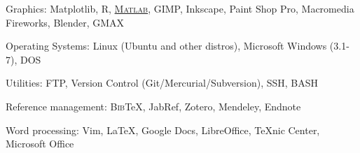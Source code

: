 \documentclass[10pt]{article}
\newcommand{\blankline}{\quad\pagebreak[2]}
\begin{document}
\blankline

Graphics: Matplotlib, R,
\href{http://www.mathworks.com/products/matlab/}{\textsc{Matlab}}, GIMP,
Inkscape, Paint Shop Pro, Macromedia Fireworks, Blender, GMAX

\blankline

Operating Systems: Linux (Ubuntu and other distros), Microsoft Windows (3.1-7),
DOS

\blankline

Utilities: FTP, Version Control (Git/Mercurial/Subversion), SSH, BASH

\blankline

Reference management: B\textsc{ib}\TeX{}, JabRef, Zotero, Mendeley, Endnote

\blankline

Word processing: Vim, \LaTeX{}, Google Docs, LibreOffice, TeXnic Center,
Microsoft Office
%
\end{document}
